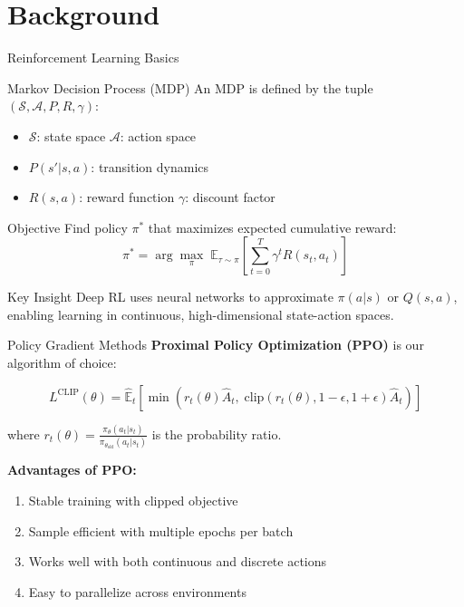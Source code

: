 \documentclass[aspectratio=169]{beamer}
\begin{document}
\section{Background}

\begin{frame}{Reinforcement Learning Basics}
  \begin{block}{Markov Decision Process (MDP)}
    An MDP is defined by the tuple $(\mathcal{S}, \mathcal{A}, P, R, \gamma)$:
    \begin{itemize}
      \item $\mathcal{S}$: state space \quad $\mathcal{A}$: action space
      \item $P(s' | s, a)$: transition dynamics
      \item $R(s, a)$: reward function \quad $\gamma$: discount factor
    \end{itemize}
  \end{block}

  \vspace{0.3cm}
  \begin{alertblock}{Objective}
    Find policy $\pi^*$ that maximizes expected cumulative reward:
    \begin{equation*}
      \pi^* = \arg\max_\pi \; \mathbb{E}_{\tau \sim \pi} \left[ \sum_{t=0}^{T} \gamma^t R(s_t, a_t) \right]
    \end{equation*}
  \end{alertblock}

  \begin{exampleblock}{Key Insight}
    Deep RL uses neural networks to approximate $\pi(a|s)$ or $Q(s,a)$, enabling learning in continuous, high-dimensional state-action spaces.
  \end{exampleblock}
\end{frame}

\begin{frame}{Policy Gradient Methods}
  \textbf{Proximal Policy Optimization (PPO)} is our algorithm of choice:

  \begin{equation*}
    L^{\text{CLIP}}(\theta) = \hat{\mathbb{E}}_t \left[ \min\left( r_t(\theta) \hat{A}_t, \; \text{clip}(r_t(\theta), 1{-}\epsilon, 1{+}\epsilon) \hat{A}_t \right) \right]
  \end{equation*}

  where $r_t(\theta) = \frac{\pi_\theta(a_t|s_t)}{\pi_{\theta_{\text{old}}}(a_t|s_t)}$ is the probability ratio.

  \vspace{0.3cm}
  \textbf{Advantages of PPO:}
  \begin{enumerate}
    \item Stable training with clipped objective
    \item Sample efficient with multiple epochs per batch
    \item Works well with both continuous and discrete actions
    \item Easy to parallelize across environments
  \end{enumerate}
\end{frame}
\end{document}
